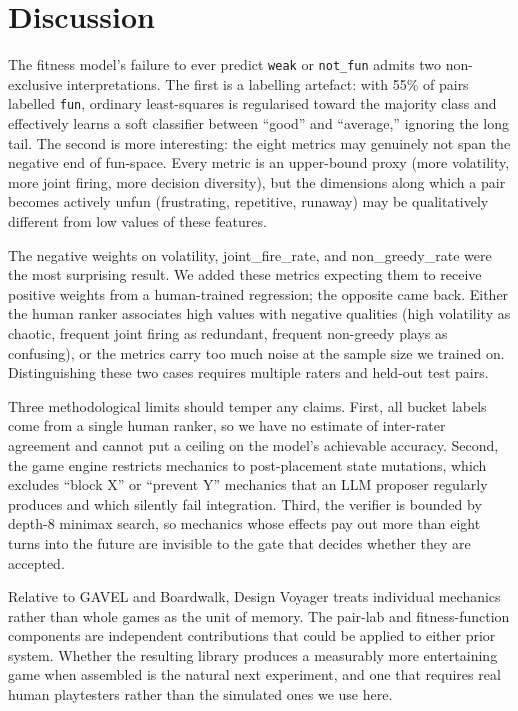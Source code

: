 \documentclass[conference]{IEEEtran}
\begin{document}
\section{Discussion}\label{sec:discussion}

The fitness model's failure to ever predict \texttt{weak} or \texttt{not\_fun} admits two non-exclusive interpretations. The first is a labelling artefact: with 55\% of pairs labelled \texttt{fun}, ordinary least-squares is regularised toward the majority class and effectively learns a soft classifier between ``good'' and ``average,'' ignoring the long tail. The second is more interesting: the eight metrics may genuinely not span the negative end of fun-space. Every metric is an upper-bound proxy (more volatility, more joint firing, more decision diversity), but the dimensions along which a pair becomes actively unfun (frustrating, repetitive, runaway) may be qualitatively different from low values of these features.

The negative weights on volatility, joint\_fire\_rate, and non\_greedy\_rate were the most surprising result. We added these metrics expecting them to receive positive weights from a human-trained regression; the opposite came back. Either the human ranker associates high values with negative qualities (high volatility as chaotic, frequent joint firing as redundant, frequent non-greedy plays as confusing), or the metrics carry too much noise at the sample size we trained on. Distinguishing these two cases requires multiple raters and held-out test pairs.

Three methodological limits should temper any claims. First, all bucket labels come from a single human ranker, so we have no estimate of inter-rater agreement and cannot put a ceiling on the model's achievable accuracy. Second, the game engine restricts mechanics to post-placement state mutations, which excludes ``block X'' or ``prevent Y'' mechanics that an LLM proposer regularly produces and which silently fail integration. Third, the verifier is bounded by depth-8 minimax search, so mechanics whose effects pay out more than eight turns into the future are invisible to the gate that decides whether they are accepted.

Relative to GAVEL and Boardwalk, Design Voyager treats individual mechanics rather than whole games as the unit of memory. The pair-lab and fitness-function components are independent contributions that could be applied to either prior system. Whether the resulting library produces a measurably more entertaining game when assembled is the natural next experiment, and one that requires real human playtesters rather than the simulated ones we use here.
\end{document}
